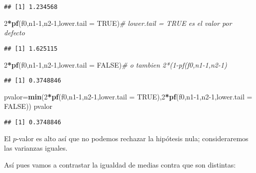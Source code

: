 \documentclass[
]{article}
\newenvironment{Shaded}{\begin{snugshade}}{\end{snugshade}}
\newcommand{\CommentTok}[1]{\textcolor[rgb]{0.56,0.35,0.01}{\textit{#1}}}
\newcommand{\DataTypeTok}[1]{\textcolor[rgb]{0.13,0.29,0.53}{#1}}
\newcommand{\DecValTok}[1]{\textcolor[rgb]{0.00,0.00,0.81}{#1}}
\newcommand{\KeywordTok}[1]{\textcolor[rgb]{0.13,0.29,0.53}{\textbf{#1}}}
\newcommand{\NormalTok}[1]{#1}
\newcommand{\OperatorTok}[1]{\textcolor[rgb]{0.81,0.36,0.00}{\textbf{#1}}}
\newcommand{\OtherTok}[1]{\textcolor[rgb]{0.56,0.35,0.01}{#1}}
\begin{document}
\begin{verbatim}
## [1] 1.234568
\end{verbatim}

\begin{Shaded}
\begin{Highlighting}[]
\DecValTok{2}\OperatorTok{*}\KeywordTok{pf}\NormalTok{(f0,n1}\DecValTok{{-}1}\NormalTok{,n2}\DecValTok{{-}1}\NormalTok{,}\DataTypeTok{lower.tail =} \OtherTok{TRUE}\NormalTok{)}\CommentTok{\# lower.tail = TRUE es el valor por defecto }
\end{Highlighting}
\end{Shaded}

\begin{verbatim}
## [1] 1.625115
\end{verbatim}

\begin{Shaded}
\begin{Highlighting}[]
\DecValTok{2}\OperatorTok{*}\KeywordTok{pf}\NormalTok{(f0,n1}\DecValTok{{-}1}\NormalTok{,n2}\DecValTok{{-}1}\NormalTok{,}\DataTypeTok{lower.tail =} \OtherTok{FALSE}\NormalTok{)}\CommentTok{\# o tambien 2*(1{-}pf(f0,n1{-}1,n2{-}1)  }
\end{Highlighting}
\end{Shaded}

\begin{verbatim}
## [1] 0.3748846
\end{verbatim}

\begin{Shaded}
\begin{Highlighting}[]
\NormalTok{pvalor=}\KeywordTok{min}\NormalTok{(}\DecValTok{2}\OperatorTok{*}\KeywordTok{pf}\NormalTok{(f0,n1}\DecValTok{{-}1}\NormalTok{,n2}\DecValTok{{-}1}\NormalTok{,}\DataTypeTok{lower.tail =} \OtherTok{TRUE}\NormalTok{),}\DecValTok{2}\OperatorTok{*}\KeywordTok{pf}\NormalTok{(f0,n1}\DecValTok{{-}1}\NormalTok{,n2}\DecValTok{{-}1}\NormalTok{,}\DataTypeTok{lower.tail =} \OtherTok{FALSE}\NormalTok{))}
\NormalTok{pvalor}
\end{Highlighting}
\end{Shaded}

\begin{verbatim}
## [1] 0.3748846
\end{verbatim}

El \(p\)-valor es alto así que no podemos rechazar la hipótesis nula;
consideraremos las varianzas iguales.

Así pues vamos a contrastar la igualdad de medias contra que son
distintas:
\end{document}
